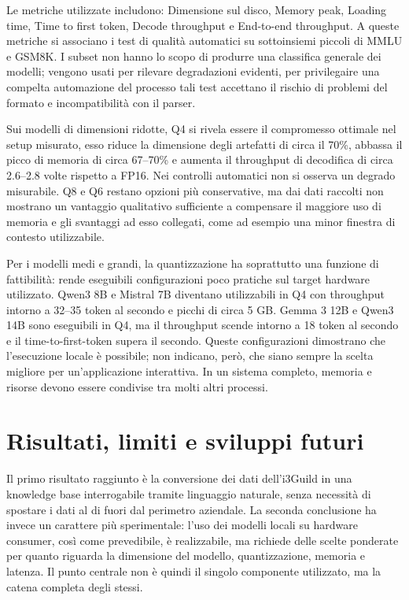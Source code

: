 \documentclass[12pt,a4paper]{article}
\begin{document}
Le metriche utilizzate includono: Dimensione sul disco, Memory peak, Loading time, 
Time to first token, Decode throughput e End-to-end throughput. A queste metriche si 
associano i test di qualità automatici su sottoinsiemi piccoli di MMLU e GSM8K. 
I subset non hanno lo scopo di produrre una classifica generale dei modelli; 
vengono usati per rilevare degradazioni evidenti, per privilegaire una compelta 
automazione del processo tali test accettano il rischio di problemi del formato e incompatibilità con il parser. 

Sui modelli di dimensioni ridotte, Q4 si rivela essere il compromesso ottimale nel setup
misurato, esso riduce la dimensione degli artefatti di circa il 70\%, abbassa il
picco di memoria di circa 67--70\% e aumenta il throughput di decodifica di
circa 2.6--2.8 volte rispetto a FP16. Nei controlli automatici non si
osserva un degrado misurabile. Q8 e Q6 restano opzioni più conservative, ma
dai dati raccolti non mostrano un vantaggio qualitativo sufficiente a compensare
il maggiore uso di memoria e gli svantaggi ad esso collegati, come ad esempio una
minor finestra di contesto utilizzabile.

Per i modelli medi e grandi, la quantizzazione ha soprattutto una funzione di
fattibilità: rende eseguibili configurazioni poco pratiche sul target hardware utilizzato.
Qwen3 8B e Mistral 7B diventano utilizzabili in Q4 con throughput intorno a
32--35 token al secondo e picchi di circa 5 GB. Gemma 3 12B e Qwen3 14B sono
eseguibili in Q4, ma il throughput scende intorno a 18 token al secondo e il
time-to-first-token supera il secondo. Queste configurazioni dimostrano che
l'esecuzione locale è possibile; non indicano, però, che siano sempre la scelta
migliore per un'applicazione interattiva. In un sistema completo, memoria e
risorse devono essere condivise tra molti altri processi.

\section*{Risultati, limiti e sviluppi futuri}

Il primo risultato raggiunto è la conversione dei dati dell'i3Guild in una 
knowledge base interrogabile tramite linguaggio naturale, 
senza necessità di spostare i dati al di fuori dal perimetro aziendale. 
La seconda conclusione ha invece un carattere più sperimentale: l'uso dei modelli 
locali su hardware consumer, così come prevedibile, è realizzabile, ma richiede delle 
scelte ponderate per quanto riguarda la dimensione del modello, quantizzazione, memoria e latenza. Il punto
centrale non è quindi il singolo componente utilizzato, ma la catena completa degli stessi.
\end{document}
